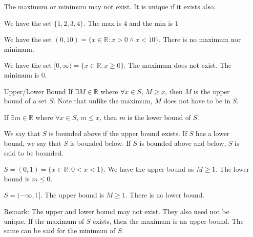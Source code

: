 \documentclass{report}
\begin{document}
The maximum or minimum may not exist. It is unique if it exists also.

\begin{examples}
    \begin{example}
        We have the set $\{1, 2, 3, 4\}$. The max is $4$ and the min is $1$
    \end{example}

    \begin{example}
        We have the set $(0, 10) = \{x \in \mathbb{R}: x > 0 \land x <  10\}$. There is no maximum nor minimum.
    \end{example}

    \begin{example}
        We have the set $[0, \infty) = \{ x \in \mathbb{R}: x \geq 0\}$. The maximum does not exist. The minimum is $0$.
    \end{example}
\end{examples}

\begin{definition}{Upper/Lower Bound}
    If $\exists M \in \mathbb{R}$ where $\forall x \in S$, $M \geq x$, then $M$ is the upper bound of a set $S$. Note that unlike the maximum, $M$ does not have to be in $S$. 

    If $\exists m \in \mathbb{R}$ where $\forall x \in S$, $m \leq x$, then $m$ is the lower bound of $S$.

    We say that $S$ is bounded above if the upper bound exists. If $S$ has a lower bound, we say that $S$ is bounded below. If $S$ is bounded above and below, $S$ is said to be bounded.
\end{definition}

\begin{examples}
    \begin{example}
        $S = (0, 1) = \{x \in \mathbb{R} : 0 <  x <  1\}$. We have the upper bound as $M \geq 1$. The lower bound is $m \leq 0$.
    \end{example}

    \begin{example}
        $S = (-\infty, 1]$. The upper bound is $M \geq 1$. There is no lower bound.
    \end{example}
\end{examples}

Remark: The upper and lower bound may not exist. They also need not be unique. If the maximum of $S$ exists, then the maximum is an upper bound. The same can be said for the minimum of $S$.
\end{document}
